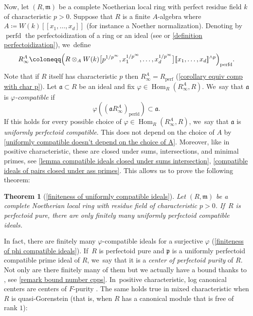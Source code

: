 \documentclass[JEP,XML,SOM,Unicode,published]{cedram}
\let\autoref\cref
\theoremstyle{plain}
\newtheorem{mainthm}{Theorem}
\theoremstyle{definition}
\numberwithin{equation}{theorem}
\let\tensor\otimes
\newcommand{\fra}{\mathfrak{a}}
\newcommand{\fram}{\mathfrak{m}}
\newcommand{\p}{\mathfrak{p}}
\DeclareMathOperator{\Hom}{Hom}
\DeclareMathOperator{\perfdd}{perfd}
\newcommand{\perfd}{_{\mathrm{perfd}}}
\newcommand{\perf}{_{\mathrm{perf}}}
\newcommand{\llbracket}{[\![}
\newcommand{\rrbracket}{]\!]}
\renewcommand{\phi}{\varphi}
\newcommand{\unpfty}{{1/p^\infty}}
\newcommand{\rafty}{R^A_\infty}
\begin{document}
Now, let $(R,\fram)$ be a complete Noetherian local ring with perfect residue field $k$ of characteristic $p>0$. Suppose that $R$ is a finite $A$-algebra where
$A\coloneqq W(k)\llbracket x_1,\ldots,x_d \rrbracket $ (for instance a Noether normalization). Denoting by $\perfdd$ the perfectoidization of a ring or an ideal (see \cite[\S 10]{BhattScholzePrisms} or \autoref{definition perfectoidization}), we~define
\[
\rafty\coloneqq \Bigl(R\tensor_A W(k)\bigl[p^\unpfty,x_1^\unpfty, \ldots,x_d^\unpfty\bigr]\llbracket x_1,\ldots,x_d\rrbracket^{\wedge p}\Bigr)\perfd.
\]
Note that if $R$ itself has characteristic $p$ then $\rafty=R\perf$ (\autoref{corollary equiv comp with char p}). Let $\fra\subset R$ be an ideal and fix $\phi\in \Hom_R(\rafty,R)$. We~say that $\fra$ is \emph{$\phi$-compatible} if
\[\phi\left(\left (\fra\rafty\right)\perfd \right) \subset \fra.
\]
If this holds for every possible choice of $\phi\in \Hom_R(\rafty,R)$, we~say that $\fra$ is \emph{uniformly perfectoid compatible}. This does not depend on the choice of $A$ by \autoref{uniformly compatible doesn't depend on the choice of A}. Moreover, like in positive characteristic, these are closed under sums, intersections, and minimal primes, see \autoref{lemma compatible ideals closed under sums intersection}, \autoref{compatible ideals of pairs closed under ass primes}. This allows us to prove the following theorem:

\begin{mainthm}[{\autoref{finiteness of uniformly compatible ideals}}]
Let $(R,\fram)$ be a complete Noetherian local ring with residue field of characteristic $p>0$. If~$R$ is perfectoid pure, there are only finitely many uniformly perfectoid compatible ideals.
\end{mainthm}

In fact, there are finitely many $\phi$-compatible ideals for a surjective $\phi$ (\autoref{finiteness of phi compatible ideals}). If~$R$ is perfectoid pure and $\p$ is a uniformly perfectoid compatible prime ideal of $R$, we~say that it is a \emph{center of perfectoid purity} of $R$. Not only are there finitely many of them but we actually have a bound thanks to \cite{SchwedeTuckerNumberOfFSplit}, see \autoref{remark bound number cpps}. In~positive characteristic, log canonical centers are centers of $F$-purity \cite{SchwedeCentersOfFPurity}. The same holds true in mixed characteristic when $R$ is quasi-Gorenstein (that is, when $R$ has a canonical module that is free of rank $1$):
\end{document}
